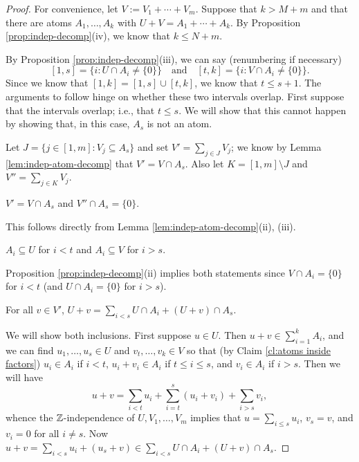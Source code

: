 \setcounter{claim}{0}
\begin{proof}
	For convenience, let $V := V_1 + \cdots + V_m$.
	Suppose that $k > M + m$ and that there are atoms $A_1,\dots,A_k$ with $U+V = A_1 + \cdots + A_k$.
	By Proposition \ref{prop:indep-decomp}(iv), we know that $k \le N+m$.
	
	By Proposition \ref{prop:indep-decomp}(iii), we can say (renumbering if necessary)
	\[ [ 1,s ] =  \{ i: U\cap A_i \neq\{0\}\} \quad \textrm{and} \quad [ t,k ] = \{i: V\cap A_i \neq \{0\}\}. \]
	Since we know that $[ 1,k ] = [ 1,s ] \cup [ t,k ]$, we know that $t \le s+1$.
	The arguments to follow hinge on whether these two intervals overlap.  
	First suppose that the intervals overlap; i.e., that $t \le s$.
	We will show that this cannot happen by showing that, in this case, $A_s$ is not an atom.
	
	Let $J = \{ j\in[1,m]: V_j \subseteq A_s \}$ and set $V' = \sum_{j\in J} V_j$; we know by Lemma \ref{lem:indep-atom-decomp} that $V' = V \cap A_s$.
	Also let $K = [ 1,m ] \setminus J$ and $V'' = \sum_{j\in K} V_j$.
	
	\begin{claim} \label{cl:relevant part of V wrt to As}
	$V' = V\cap A_s$ and $V'' \cap A_s = \{0\}$. \label{cla}
	\end{claim}

	This follows directly from Lemma \ref{lem:indep-atom-decomp}(ii), (iii).
	
	\begin{claim} \label{cl:atoms inside factors}
	$A_i \subseteq U$ for $i<t$ and $A_i \subseteq V$ for $i > s$. \label{clb}
	\end{claim}
	
	Proposition \ref{prop:indep-decomp}(ii) implies both statements since $V \cap A_i = \{0\}$ for $i<t$ (and $U\cap A_i = \{0\}$ for $i>s$).
	
	\begin{claim} \label{cl:translates of U}
	For all $v\in V'$, $U+v = \sum\limits_{i<s} U\cap A_i + (U+v)\cap A_s$. \label{clc}
	\end{claim}

	
	We will show both inclusions.
	First suppose $u\in U$. 
	Then $u+v \in \sum_{i=1}^k A_i$, and we can find $u_1,\dots, u_s\in U$ and $v_t,\dots, v_k\in V$ so that (by Claim \ref{cl:atoms inside factors})
	$u_i\in A_i$ if $i < t$, $u_i + v_i \in A_i$ if $t\le i \le s$, and $v_i \in A_i$ if $i > s$.
	Then we will have
	\[u+v = \sum_{i<t} u_i + \sum_{i=t}^{s} (u_i+v_i) + \sum_{i > s} v_i, \]
	whence the $\mathbb{Z}$-independence of $U,V_1,\dots,V_m$ implies that $u = \sum_{i\le s} u_i$, $v_s = v$, and $v_i = 0$ for all $i\neq s$.
	Now $u+v = \sum_{i<s} u_i + (u_s+v)\in \sum_{i<s} U\cap A_i + (U+v)\cap A_s$.
	

\end{proof}

